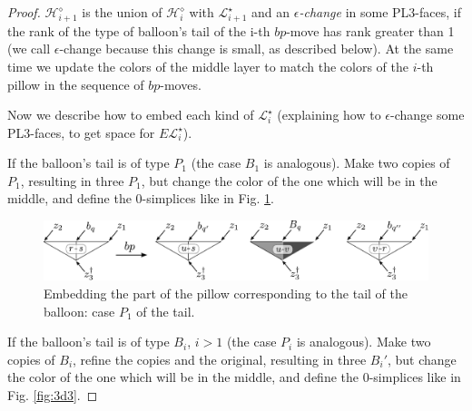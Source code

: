\begin{proof}
$\mathcal{H}_{i+1}^\diamond$ is the union of $\mathcal{H}_{i}^\diamond$ with $\mathcal{L}_{i+1}^\star$
and an {\em $\epsilon$-change} in some PL3-faces, if the rank of the type of balloon's tail of the i-th $bp$-move has rank greater than 1
(we call $\epsilon$-change because this change is small, as described below).
At the same time we update the colors of the middle layer to match the colors of the $i$-th pillow in the sequence of $bp$-moves.



Now we describe how to embed each kind of $\mathcal{L}_{i}^\star$ 
(explaining how to $\epsilon$-change some PL3-faces,
to get space for $E\mathcal{L}_i^\star$).


If the balloon's tail is of type $P_1$ (the case $B_1$ is analogous).
Make two copies of $P_1$, resulting in three $P_1$, but change the color of the one which will be in
the middle, and define the 0-simplices like in Fig. \ref{fig:3d2}.

\begin{figure}[!htb] 
\begin{center}
\includegraphics[width=14cm]{A.figs/3d2.pdf}
\caption{Embedding the part of the pillow corresponding to the tail of the balloon: case $P_1$ of the tail.}
\label{fig:3d2}
\end{center}
\end{figure}
If the balloon's tail is of type $B_i$, $i>1$ (the case $P_i$ is analogous).
Make two copies of $B_i$, refine the copies and the original, resulting in three $B_i'$, 
but change the color of the one which will be in
the middle, and define the 0-simplices like in Fig. \ref{fig:3d3}.



\end{proof}

